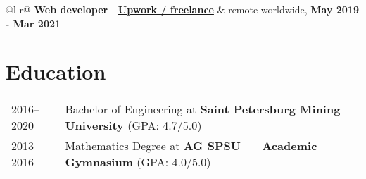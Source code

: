 \documentclass[a4paper,12pt]{article}
\begin{document}
    \begin{tabularx}{\linewidth}{ @{}l r@{} }
        \textbf{Web developer $|$ \underline{Upwork / freelance}} & \hfill remote worldwide, \textbf{May 2019 - Mar 2021}\\[3.75pt]
    \end{tabularx}

    \section{Education}\label{sec:education}
    \begin{tabularx}{\linewidth}{@{}l X@{}}
        2016--2020 & Bachelor of Engineering at \textbf{Saint Petersburg Mining University} \hfill \normalsize (GPA: 4.7/5.0) \\
        2013--2016 & Mathematics Degree at \textbf{AG SPSU — Academic Gymnasium} \hfill (GPA: 4.0/5.0) \\
    \end{tabularx}

    \vfill
\end{document}
